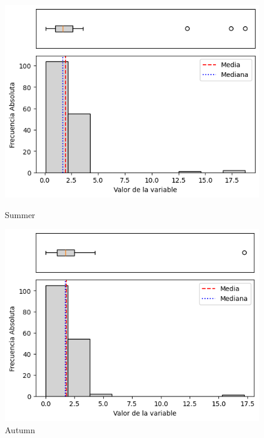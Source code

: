 \begin{figure}[H]
\centering
\begin{minipage}{0.30\textwidth}
  \includegraphics[width=\linewidth]{resultados/por_estacion_del_anio/boxplot_clases_por_estacion/Candavare/WS_HistBoxplot_Summer.png}
  \caption*{Summer}
\end{minipage}
\hfill
\begin{minipage}{0.30\textwidth}
  \includegraphics[width=\linewidth]{resultados/por_estacion_del_anio/boxplot_clases_por_estacion/Candavare/WS_HistBoxplot_Autumn.png}
  \caption*{Autumn}
\end{minipage}

\vspace{0.2cm}


\end{figure}
